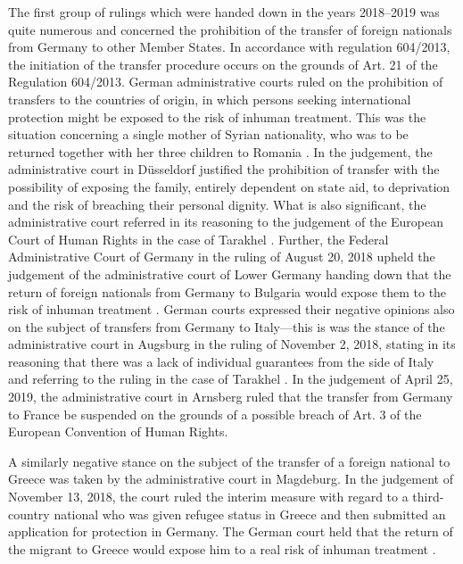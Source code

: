 \documentclass[10pt,a4paper]{article}
\begin{document}
\begin{multicols}{2}
The first group of rulings which were handed down in the years 2018--2019 was quite numerous and concerned the prohibition of the transfer of foreign nationals from Germany to other Member States. In accordance with regulation 604/2013, the initiation of the transfer procedure occurs on the grounds of Art. 21 of the Regulation 604/2013. German administrative courts ruled on the prohibition of transfers to the countries of origin, in which persons seeking international protection might be exposed to the risk of inhuman treatment. This was the situation concerning a single mother of Syrian nationality, who was to be returned together with her three children to Romania \citep{R91}. In the judgement, the administrative court in Düsseldorf justified the prohibition of transfer with the possibility of exposing the family, entirely dependent on state aid, to deprivation and the risk of breaching their personal dignity. What is also significant, the administrative court referred in its reasoning to the judgement of the European Court of Human Rights in the case of Tarakhel \citep{R92}. Further, the Federal Administrative Court of Germany in the ruling of August 20, 2018 upheld the judgement of the administrative court of Lower Germany handing down that the return of foreign nationals from Germany to Bulgaria would expose them to the risk of inhuman treatment \citep{R93}. German courts expressed their negative opinions also on the subject of transfers from Germany to Italy---this is was the stance of the administrative court in Augsburg in the ruling of November 2, 2018, stating in its reasoning that there was a lack of individual guarantees from the side of Italy and referring to the ruling in the case of Tarakhel \citep{R94}. In the judgement of April 25, 2019, the administrative court in Arnsberg ruled that the transfer from Germany to France be suspended on the grounds of a possible breach of Art. 3 of the European Convention of Human Rights.

A similarly negative stance on the subject of the transfer of a foreign national to Greece was taken by the administrative court in Magdeburg. In the judgement of November 13, 2018, the court ruled the interim measure with regard to a third-country national who was given refugee status in Greece and then submitted an application for protection in Germany. The German court held that the return of the migrant to Greece would expose him to a real risk of inhuman treatment \citep{R95}.


\end{multicols}
\end{document}
